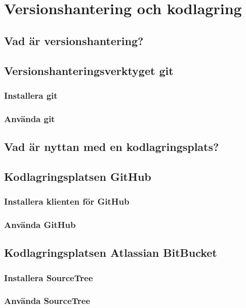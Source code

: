 

\chapter{Versionshantering och kodlagring}

\section{Vad är versionshantering?}

\section{Versionshanteringsverktyget git}

\subsection{Installera git}

\subsection{Använda git}

\section{Vad är nyttan med en kodlagringsplats?}

\section{Kodlagringsplatsen GitHub}

\subsection{Installera klienten för GitHub}

\subsection{Använda GitHub}


\section{Kodlagringsplatsen Atlassian BitBucket}

\subsection{Installera SourceTree}

\subsection{Använda SourceTree}

